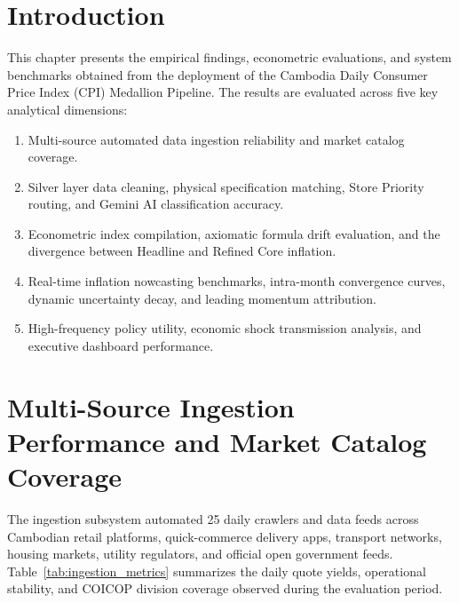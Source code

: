 
\section{Introduction}
\hs This chapter presents the empirical findings, econometric evaluations, and system benchmarks obtained from the deployment of the Cambodia Daily Consumer Price Index (CPI) Medallion Pipeline. The results are evaluated across five key analytical dimensions:
\begin{enumerate}
    \item Multi-source automated data ingestion reliability and market catalog coverage.
    \item Silver layer data cleaning, physical specification matching, Store Priority routing, and Gemini AI classification accuracy.
    \item Econometric index compilation, axiomatic formula drift evaluation, and the divergence between Headline and Refined Core inflation.
    \item Real-time inflation nowcasting benchmarks, intra-month convergence curves, dynamic uncertainty decay, and leading momentum attribution.
    \item High-frequency policy utility, economic shock transmission analysis, and executive dashboard performance.
\end{enumerate}

\section{Multi-Source Ingestion Performance and Market Catalog Coverage}
\hs The ingestion subsystem automated 25 daily crawlers and data feeds across Cambodian retail platforms, quick-commerce delivery apps, transport networks, housing markets, utility regulators, and official open government feeds. Table~\ref{tab:ingestion_metrics} summarizes the daily quote yields, operational stability, and COICOP division coverage observed during the evaluation period.

